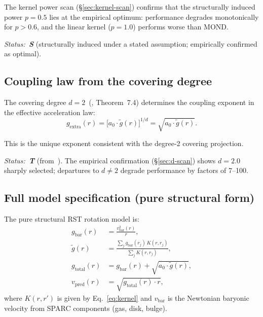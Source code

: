 \documentclass[11pt,a4paper]{article}
\begin{document}
The kernel power scan (\S\ref{sec:kernel-scan}) confirms that the structurally induced power $p = 0.5$ lies at the empirical optimum: performance degrades monotonically for $p > 0.6$, and the linear kernel ($p = 1.0$) performs worse than MOND.

\textit{Status:~\textbf{S}} (structurally induced under a stated assumption; empirically confirmed as optimal).

\subsection{Coupling law from the covering degree}
\label{sec:coupling}

The covering degree $d = 2$~(\cite{Wells2026a}, Theorem~7.4) determines the coupling exponent in the effective acceleration law:
\begin{equation}
\label{eq:coupling}
g_{\mathrm{extra}}(r) = \bigl[a_0 \cdot \tilde{g}(r)\bigr]^{1/d} = \sqrt{a_0 \cdot \tilde{g}(r)}.
\end{equation}

This is the unique exponent consistent with the degree-2 covering projection.

\textit{Status:~\textbf{T}} (from~\cite{Wells2026a}).
The empirical confirmation (\S\ref{sec:d-scan}) shows $d = 2.0$ sharply selected; departures to $d \neq 2$ degrade performance by factors of 7--100.

\subsection{Full model specification (pure structural form)}
\label{sec:model-spec}

The pure structural RST rotation model is:
\begin{align}
g_{\mathrm{bar}}(r) &= \frac{v_{\mathrm{bar}}^2(r)}{r}, \label{eq:gbar} \\[4pt]
\tilde{g}(r) &= \frac{\sum_j g_{\mathrm{bar}}(r_j)\,K(r, r_j)}{\sum_j K(r, r_j)}, \label{eq:gtilde} \\[4pt]
g_{\mathrm{total}}(r) &= g_{\mathrm{bar}}(r) + \sqrt{a_0 \cdot \tilde{g}(r)}, \label{eq:gtotal} \\[4pt]
v_{\mathrm{pred}}(r) &= \sqrt{g_{\mathrm{total}}(r) \cdot r}, \label{eq:vpred}
\end{align}
where $K(r,r')$ is given by Eq.~\eqref{eq:kernel} and $v_{\mathrm{bar}}$ is the Newtonian baryonic velocity from SPARC components (gas, disk, bulge).
\end{document}

